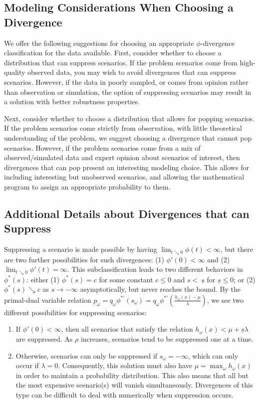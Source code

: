 \documentclass[ijoc,nonblindrev]{informs3} %
\begin{document}
\subsection{Modeling Considerations When Choosing a Divergence}

We offer the following suggestions for choosing an appropriate $\phi$-divergence classification for the data available.
First, consider whether to choose a distribution that can suppress scenarios.
If the problem scenarios come from high-quality observed data, you may wish to avoid divergences that can suppress scenarios.
However, if the data in poorly sampled, or comes from opinion rather than observation or simulation, the option of suppressing scenarios may result in a solution with better robustness properties.

Next, consider whether to choose a distribution that allows for popping scenarios.
If the problem scenarios come strictly from observation, with little theoretical understanding of the problem, we suggest choosing a divergence that cannot pop scenarios.
However, if the problem scenarios come from a mix of observed/simulated data and expert opinion about scenarios of interest, then divergences that can pop present an interesting modeling choice.
This allows for including interesting but unobserved scenarios, and allowing the mathematical program to assign an appropriate probability to them.

\subsection{Additional Details about Divergences that can Suppress}
\label{ssec:suppress}

Suppressing a scenario is made possible by having $\lim_{t \searrow 0} \phi(t) < \infty$, but there are two further possibilities for such divergences: (1) $\phi'(0) < \infty$ and (2) $\lim_{t \searrow 0} \phi'(t) = \infty$.
This subclassification leads to two different behaviors in $\phi^*(s)$: either (1) $\phi^*(s) = c$ for some constant $c \leq 0$ and  $s <\ \underline{s}$ for $\underline{s} \leq 0$; or (2) $\phi^*(s) \searrow c$ as $s \rightarrow -\infty$ asymptotically, but never reaches the bound.
By the primal-dual variable relation $p_\omega = q_\omega \phi^{*\prime}(s_\omega) = q_\omega \phi^{*\prime}\left(\frac{h_\omega(x) - \mu}{\lambda}\right)$, we see two different possibilities for suppressing scenarios:
\begin{enumerate}
	\item If $\phi'(0) < \infty$, then all scenarios that satisfy the relation $h_\omega(x) < \mu + \underline{s}\lambda$ are suppressed.
		As $\rho$ increases, scenarios tend to be suppressed one at a time.
	\item Otherwise, scenarios can only be suppressed if $s_\omega = -\infty$, which can only occur if $\lambda = 0$.
		Consequently, this solution must also have $\mu = \max_\omega h_\omega(x)$ in order to maintain a probability distribution.
		This also means that all but the most expensive scenario(s) will vanish simultaneously.
		Divergences of this type can be difficult to deal with numerically when suppression occurs.
\end{enumerate}
\end{document}
